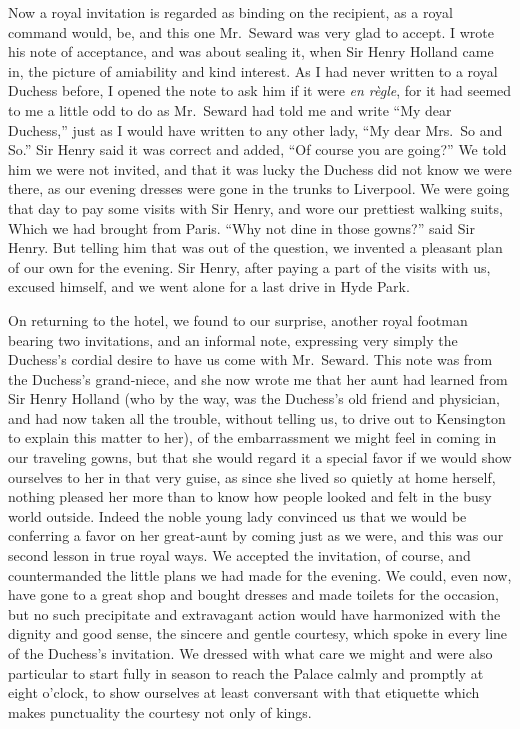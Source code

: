 \documentclass[12pt]{book}
\begin{document}
Now a royal invitation is regarded as binding on the recipient, as a royal
command would, be, and this one Mr.~Seward was very glad to accept. I wrote
his note of acceptance, and was about sealing it, when Sir Henry Holland came
in, the picture of amiability and kind interest. As I had never written to a royal
Duchess before, I opened the note to ask him if it were {\it en règle}, for it had seemed
to me a little odd to do as Mr.~Seward had told me and write “My dear Duchess,”
just as I would have written to any other lady, “My dear Mrs.~So and So.” Sir
Henry said it was correct and added, “Of course you are going?” We told him
we were not invited, and that it was lucky the Duchess did not know we were
there, as our evening dresses were gone in the trunks to Liverpool. We were
going that day to pay some visits with Sir Henry, and wore our prettiest walking
suits, Which we had brought from Paris. “Why not dine in those gowns?” said
Sir Henry. But telling him that was out of the question, we invented a pleasant
plan of our own for the evening. Sir Henry, after paying a part of the visits with
us, excused himself, and we went alone for a last drive in Hyde Park.

On returning to the hotel, we found to our surprise, another royal footman bearing two invitations, and an informal note, expressing very simply the
Duchess’s cordial desire to have us come with Mr.~Seward. This note was from
the Duchess’s grand‐niece, and she now wrote me that her aunt had learned from
Sir Henry Holland (who by the way, was the Duchess’s old friend and physician,
and had now taken all the trouble, without telling us, to drive out to Kensington
to explain this matter to her), of the embarrassment we might feel in coming in
our traveling gowns, but that she would regard it a special favor if we would
show ourselves to her in that very guise, as since she lived so quietly at home
herself, nothing pleased her more than to know how people looked and felt in
the busy world outside. Indeed the noble young lady convinced us that we would
be conferring a favor on her great‐aunt by coming just as we were, and this was
our second lesson in true royal ways. We accepted the invitation, of course, and
countermanded the little plans we had made for the evening. We could, even now,
have gone to a great shop and bought dresses and made toilets for the occasion,
but no such precipitate and extravagant action would have harmonized with the
dignity and good sense, the sincere and gentle courtesy, which spoke in every
line of the Duchess’s invitation. We dressed with what care we might and were
also particular to start fully in season to reach the Palace calmly and promptly
at eight o’clock, to show ourselves at least conversant with that etiquette which
makes punctuality the courtesy not only of kings.
\end{document}
